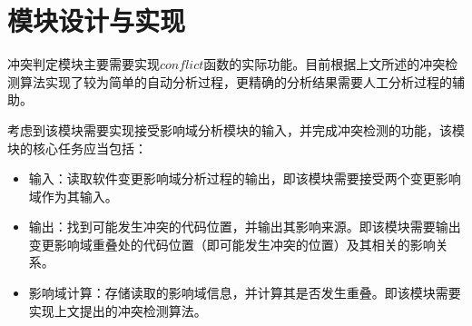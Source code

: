 \section{模块设计与实现}
\label {chap_mod}

冲突判定模块主要需要实现$conflict$函数的实际功能。目前根据上文所述的冲突检测算法实现了较为简单的自动分析过程，更精确的分析结果需要人工分析过程的辅助。

%
%

考虑到该模块需要实现接受影响域分析模块的输入，并完成冲突检测的功能，该模块的核心任务应当包括：
\begin{itemize}
	\item 输入：读取软件变更影响域分析过程的输出，即该模块需要接受两个变更影响域作为其输入。
	\item 输出：找到可能发生冲突的代码位置，并输出其影响来源。即该模块需要输出变更影响域重叠处的代码位置（即可能发生冲突的位置）及其相关的影响关系。
	\item 影响域计算：存储读取的影响域信息，并计算其是否发生重叠。即该模块需要实现上文提出的冲突检测算法。
\end{itemize}



